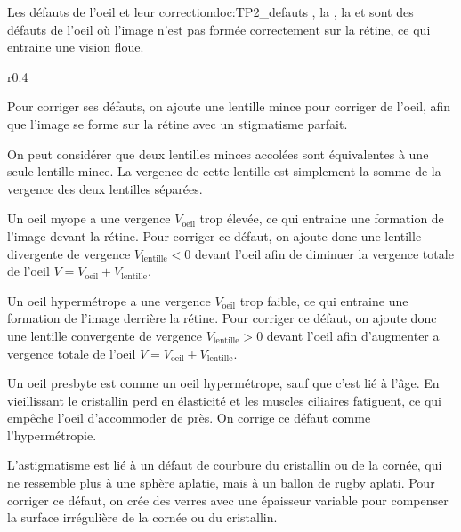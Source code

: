 \begin{doc}{Les défauts de l'oeil et leur correction}{doc:TP2_defauts}
  , la , la  et  sont des défauts de l'oeil où l'image n'est pas formée correctement sur la rétine, ce qui entraine une vision floue.

  \begin{wrapfigure}[10]{r}{0.4\linewidth}
    \centering
    \vspace*{-2pt}
    
  \end{wrapfigure}
  
  Pour corriger ses défauts, on ajoute une lentille mince pour corriger  de l'oeil, afin que l'image se forme sur la rétine avec un stigmatisme parfait.

  \begin{encart}
    On peut considérer que deux lentilles minces accolées sont équivalentes à une seule lentille mince.
    La vergence de cette lentille est simplement la somme de la vergence des deux lentilles séparées.
  \end{encart}

  \pointCyan {}

  Un oeil myope a une vergence $V_\text{oeil}$ trop élevée, ce qui entraine une formation de l'image devant la rétine.
  Pour corriger ce défaut, on ajoute donc une lentille divergente de vergence $V_\text{lentille} < 0$ devant l'oeil afin de diminuer la vergence totale de l'oeil $V = V_\text{oeil} + V_\text{lentille}$.

  \pointCyan {}

  Un oeil hypermétrope a une vergence $V_\text{oeil}$ trop faible, ce qui entraine une formation de l'image derrière la rétine.
  Pour corriger ce défaut, on ajoute donc une lentille convergente de vergence $V_\text{lentille} > 0$ devant l'oeil afin d'augmenter a vergence totale de l'oeil $V = V_\text{oeil} + V_\text{lentille}$.

  \pointCyan {}

  Un oeil presbyte est comme un oeil hypermétrope, sauf que c'est lié à l'âge.
  En vieillissant le cristallin perd en élasticité et les muscles ciliaires fatiguent, ce qui empêche l'oeil d'accommoder de près.
  On corrige ce défaut comme l'hypermétropie.

  \pointCyan {}

  L'astigmatisme est lié à un défaut de courbure du cristallin ou de la cornée, qui ne ressemble plus à une sphère aplatie, mais à un ballon de rugby aplati.
  Pour corriger ce défaut, on crée des verres avec une épaisseur variable pour compenser la surface irrégulière de la cornée ou du cristallin.
\end{doc}

